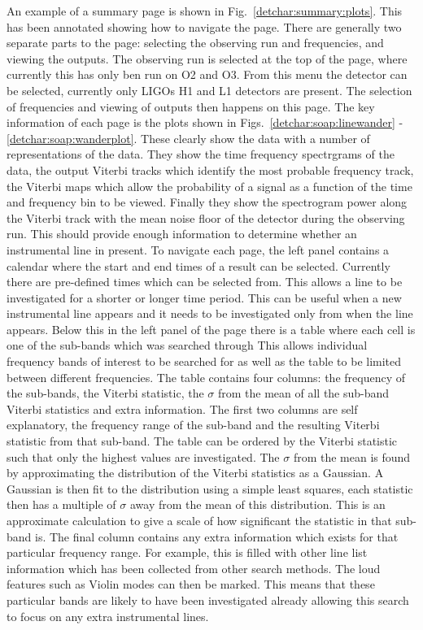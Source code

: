 An example of a summary page is shown in Fig.~\ref{detchar:summary:plots}. This has been annotated showing how to navigate the page. 
There are generally two separate parts to the page: selecting the observing run and frequencies, and viewing the outputs.
The observing run is selected at the top of the page, where currently this has only ben run on O2 and O3. 
From this menu the detector can be selected, currently only \glspl{LIGO} H1 and L1 detectors are present.
The selection of frequencies and viewing of outputs then happens on this page.
The key information of each page is the plots shown in Figs.~\ref{detchar:soap:linewander} - \ref{detchar:soap:wanderplot}.
These clearly show the data with a number of representations of the data. They show the time frequency spectrgrams of the data, the output Viterbi tracks which identify the most probable frequency track, the Viterbi maps which allow the probability of a signal as a function of the time and frequency bin to be viewed. 
Finally they show the spectrogram power along the Viterbi track with the mean noise floor of the detector during the observing run.
This should provide enough information to determine whether an instrumental line in present.
To navigate each page, the left panel contains a calendar where the start and end times of a result can be selected. 
Currently there are pre-defined times which can be selected from. This allows a line to be investigated for a shorter or longer time period.
This can be useful when a new instrumental line appears and it needs to be investigated only from when the line appears. 
Below this in the left panel of the page there is a table where each cell is one of the sub-bands which was searched through 
This allows individual frequency bands of interest to be searched for as well as the table to be limited between different frequencies.
The table contains four columns: the frequency of the sub-bands, the Viterbi statistic, the $\sigma$ from the mean of all the sub-band Viterbi statistics and extra information.
The first two columns are self explanatory, the frequency range of the sub-band and the resulting Viterbi statistic from that sub-band. The table can be ordered by the Viterbi statistic such that only the highest values are investigated.
The $\sigma$ from the mean is found by approximating the distribution of the Viterbi statistics as a Gaussian. 
A Gaussian is then fit to the distribution using a simple least squares, each statistic then has a multiple of $\sigma$ away from the mean of this distribution. 
This is an approximate calculation to give a scale of how significant the statistic in that sub-band is.
The final column contains any extra information which exists for that particular frequency range.
For example, this is filled with other line list information which has been collected from other search methods.
The loud features such as Violin modes can then be marked. This means that these particular bands are likely to have been investigated already allowing this search to focus on any extra instrumental lines.



